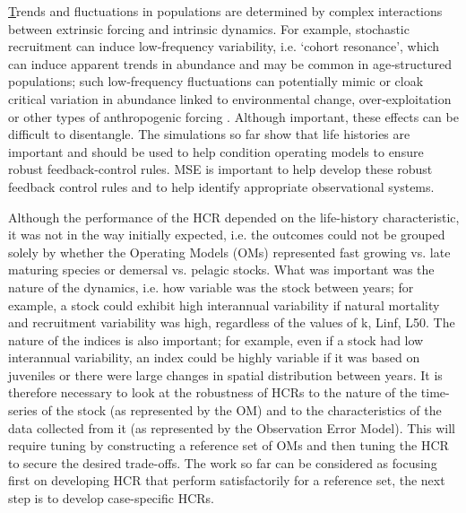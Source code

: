 \href{http://ices.dk/sites/pub/Publication%20Reports/Expert%20Group%20Report/acom/2018/WKLIFEVIII/WKLIFEVIII_2018.pdf}

Trends and fluctuations in populations are determined by complex interactions between extrinsic forcing and intrinsic dynamics. For example, stochastic recruitment can induce low‐frequency variability, i.e. ‘cohort resonance’, which can induce apparent trends in abundance and may be common in age‐structured populations; such low‐frequency fluctuations can potentially mimic or cloak critical variation in abundance linked to environmental change, over‐exploitation or other types of anthropogenic forcing \citep{bjornstad2004trends}. Although important, these effects can be difficult to disentangle. The simulations so far show that life histories are important and should be used to help condition operating models to ensure robust feedback-control rules. MSE is important to help develop these robust feedback control rules and to help identify appropriate observational systems.

Although the performance of the HCR depended on the life-history characteristic, it was not in the way initially expected, i.e. the outcomes could not be grouped solely by whether the Operating Models (OMs) represented fast growing vs. late maturing species or demersal vs. pelagic stocks. What was important was the nature of the dynamics, i.e. how variable was the stock between years; for example, a stock could exhibit high interannual variability if natural mortality and recruitment variability was high, regardless of the values of k, Linf, L50. The nature of the indices is also important; for example, even if a stock had low interannual variability, an index could be highly variable if it was based on juveniles or there were large changes in spatial distribution between years. It is therefore necessary to look at the robustness of HCRs to the nature of the time-series of the stock (as represented by the OM) and to the characteristics of the data collected from it (as represented by the Observation Error Model). This will require tuning by constructing a reference set of OMs and then tuning the HCR to secure the desired trade-offs. The work so far can be considered as focusing first on developing HCR that perform satisfactorily for a reference set, the next step is to develop case-specific HCRs.


